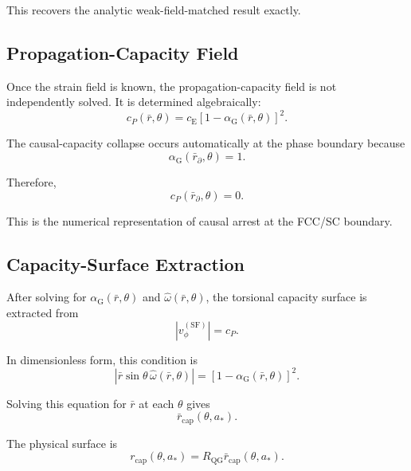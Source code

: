 This recovers the analytic weak-field-matched result exactly.

\subsection{Propagation-Capacity Field}

Once the strain field is known, the propagation-capacity field is not independently solved. It is determined algebraically:
\begin{equation}
    \boxed{ c_P(\bar{r},\theta) = c_{\mathrm{E}} \left[ 1-\alpha_{\mathrm{G}}(\bar{r},\theta) \right]^2. }
\end{equation}

The causal-capacity collapse occurs automatically at the phase boundary because
\begin{equation}
    \alpha_{\mathrm{G}}(\bar{r}_{\partial},\theta) = 1.
\end{equation}

Therefore,
\begin{equation}
    \boxed{ c_P(\bar{r}_{\partial},\theta) = 0. }
\end{equation}

This is the numerical representation of causal arrest at the FCC/SC boundary.

\subsection{Capacity-Surface Extraction}

After solving for $\alpha_{\mathrm{G}}(\bar{r},\theta)$ and $\widehat{\omega}(\bar{r},\theta)$, the torsional capacity surface is extracted from
\begin{equation}
    \left| v_{\phi}^{(\mathrm{SF})} \right| = c_P.
\end{equation}

In dimensionless form, this condition is
\begin{equation}
    \boxed{ \left| \bar{r}\sin\theta \, \widehat{\omega}(\bar{r},\theta) \right| = \left[ 1-\alpha_{\mathrm{G}}(\bar{r},\theta) \right]^2. }
\end{equation}

Solving this equation for $\bar{r}$ at each $\theta$ gives
\begin{equation}
    \boxed{ \bar{r}_{\mathrm{cap}}(\theta,a_\ast). }
\end{equation}

The physical surface is
\begin{equation}
    r_{\mathrm{cap}}(\theta,a_\ast) = R_{\mathrm{QG}}\bar{r}_{\mathrm{cap}}(\theta,a_\ast).
\end{equation}

